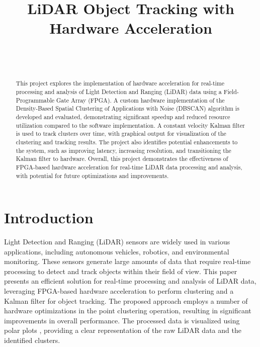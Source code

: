\documentclass[journal]{IEEEtran} %
\begin{document}
\title{LiDAR Object Tracking with Hardware Acceleration}


\author{%
    \\%
    \\%
}

\maketitle

\begin{abstract}
This project explores the implementation of hardware acceleration for real-time processing and analysis of Light Detection and Ranging (LiDAR) data using a Field-Programmable Gate Array (FPGA). A custom hardware implementation of the Density-Based Spatial Clustering of Applications with Noise (DBSCAN) algorithm is developed and evaluated, demonstrating significant speedup and reduced resource utilization compared to the software implementation. A constant velocity Kalman filter is used to track clusters over time, with graphical output for visualization of the clustering and tracking results. The project also identifies potential enhancements to the system, such as improving latency, increasing resolution, and transitioning the Kalman filter to hardware. Overall, this project demonstrates the effectiveness of FPGA-based hardware acceleration for real-time LiDAR data processing and analysis, with potential for future optimizations and improvements.
\end{abstract}

\section{Introduction}
Light Detection and Ranging (LiDAR) sensors are widely used in various applications, including autonomous vehicles, robotics, and environmental monitoring. These sensors generate large amounts of data that require real-time processing to detect and track objects within their field of view. This paper presents an efficient solution for real-time processing and analysis of LiDAR data, leveraging FPGA-based hardware acceleration to perform clustering and a Kalman filter for object tracking. The proposed approach employs a number of hardware optimizations in the point clustering operation, resulting in significant improvements in overall performance. The processed data is visualized using polar plots , providing a clear representation of the raw LiDAR data and the identified clusters.
\end{document}
